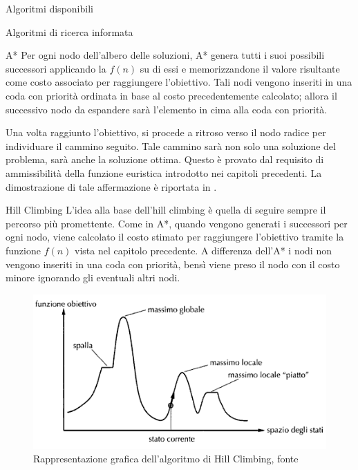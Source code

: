 \begin{chapter}{Algoritmi disponibili}
\begin{section}{Algoritmi di ricerca informata}
\begin{subsection}{A*}
    Per ogni nodo dell'albero delle soluzioni, A* genera tutti i suoi possibili successori applicando
    la $f(n)$ su di essi e memorizzandone il valore risultante come costo associato per raggiungere
    l'obiettivo. Tali nodi vengono inseriti in una coda con priorit\`a ordinata in base al costo
    precedentemente calcolato; allora il successivo nodo da espandere sar\`a l'elemento in cima alla
    coda con priorit\`a.

    Una volta raggiunto l'obiettivo, si procede a ritroso verso il nodo radice per individuare il
    cammino seguito. Tale cammino sar\`a non solo una soluzione del problema, sar\`a anche la
    soluzione ottima. Questo \`e provato dal requisito di ammissibilit\`a della funzione euristica
    introdotto nei capitoli precedenti. La dimostrazione di tale affermazione \`e riportata
    in \cite{norvig03}.
    \end{subsection}

    \begin{subsection}{Hill Climbing}
    L'idea alla base dell'hill climbing \`e quella di seguire sempre il percorso pi\`u promettente.
    Come in A*, quando vengono generati i successori per ogni nodo, viene calcolato il costo
    stimato per raggiungere l'obiettivo tramite la funzione $f(n)$ vista nel capitolo precedente.
    A differenza dell'A* i nodi non vengono inseriti in una coda con priorit\`a, bens\`i viene
    preso il nodo con il costo minore ignorando gli eventuali altri nodi.

    \begin{figure}[!htb]
        \centering
        \includegraphics[scale=0.5]{img/hillclimbing.png}
        \caption{Rappresentazione grafica dell'algoritmo di Hill Climbing, fonte \cite{norvig03}}
        \label{fig:hillclimbing}
    \end{figure}


\end{subsection}
\end{section}
\end{chapter}
